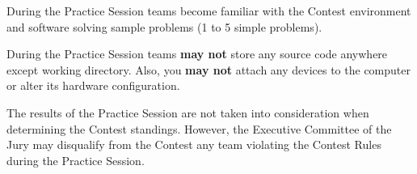 
During the Practice Session teams become familiar with the Contest
environment and software solving sample problems
(1 to 5 simple problems).

During the Practice Session teams \textbf{may not} store any source code
anywhere except working directory.
Also, you \textbf{may not} attach any devices to the computer or alter its
hardware configuration.

The results of the Practice Session are not taken into consideration when
determining the Contest standings. However, the Executive Committee of the
Jury may disqualify from the Contest any team violating the Contest Rules
during the Practice Session.
